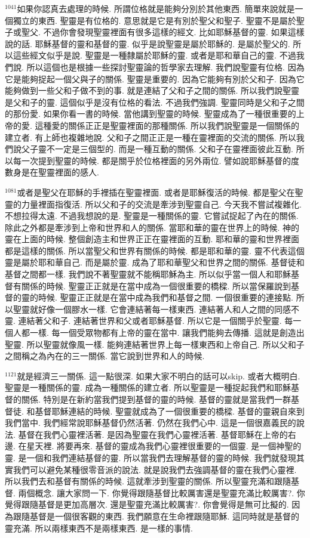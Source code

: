 \documentclass{book}
\begin{document}
$^{1041}$如果你認真去處理的時候.
所謂位格就是能夠分別於其他東西.
簡單來說就是一個獨立的東西.
聖靈是有位格的.
意思就是它是有別於聖父和聖子.
聖靈不是屬於聖子或聖父.
不過你會發現聖靈裡面有很多這樣的經文.
比如耶穌基督的靈.
如果這樣說的話.
耶穌基督的靈和基督的靈.
似乎是說聖靈是屬於耶穌的.
是屬於聖父的.
所以這些經文似乎是說.
聖靈是一種隸屬於耶穌的靈.
或者是耶和華自己的靈.
不過我們說.
所以這個也是根據一些探討聖靈論的哲學家去理解.
我們說聖靈有位格.
因為它是能夠捉起一個父與子的關係.
聖靈是重要的.
因為它能夠有別於父和子.
因為它能夠做到一些父和子做不到的事.
就是連結了父和子之間的關係.
所以我們說聖靈是父和子的靈.
這個似乎是沒有位格的看法.
不過我們強調.
聖靈同時是父和子之間的那份愛.
如果你看一書的時候.
當他講到聖靈的時候.
聖靈成為了一種很重要的上帝的愛.
這種愛的關係正正是聖靈裡面的那種關係.
所以我們說聖靈是一個關係的建立者.
有上師也複雜地說.
父和子之間正正是一種在靈裡面的交流的關係.
所以我們說父子靈不一定是三個型的.
而是一種互動的關係.
父和子在靈裡面彼此互動.
所以每一次提到聖靈的時候.
都是關乎於位格裡面的另外兩位.
譬如說耶穌基督的度數身是在聖靈裡面的感人.

$^{1081}$或者是聖父在耶穌的手裡插在聖靈裡面.
或者是耶穌復活的時候.
都是聖父在聖靈的力量裡面指復活.
所以父和子的交流是牽涉到聖靈自己.
今天我不嘗試複雜化.
不想拉得太遠.
不過我想說的是.
聖靈是一種關係的靈.
它嘗試捉起了內在的關係.
除此之外都是牽涉到上帝和世界和人的關係.
當耶和華的靈在世界上的時候.
神的靈在上面的時候.
整個創造主和世界正正在靈裡面的互動.
耶和華的靈和世界裡面都是這樣的關係.
所以當聖父和世界有關係的時候.
都是耶和華的靈.
靈不代表這個靈是屬於耶和華自己.
而是屬於靈.
成為了耶和華聖父和世界之間的關係.
基督徒和基督之間都一樣.
我們說不著聖靈就不能稱耶穌為主.
所以似乎當一個人和耶穌基督有關係的時候.
聖靈正正就是在當中成為一個很重要的橋樑.
所以當保羅說到基督的靈的時候.
聖靈正正就是在當中成為我們和基督之間.
一個很重要的連接點.
所以聖靈就好像一個膠水一樣.
它會連結著每一樣東西.
連結著人和人之間的同感不靈.
連結著父和子.
連結著世界和父或者耶穌基督.
所以它是一個關乎於聖靈.
每一個人都一樣.
每一個受眾物都有上帝的靈在當中.
讓我們能夠去傳播.
這就是創造出聖靈.
所以聖靈就像風一樣.
能夠連結著世界上每一樣東西和上帝自己.
所以父和子之間稱之為內在的三一關係.
當它說到世界和人的時候.

$^{1121}$就是經濟三一關係.
這一點很深.
如果大家不明白的話可以skip.
或者大概明白.
聖靈是一種關係的靈.
成為一種關係的建立者.
所以聖靈是一種捉起我們和耶穌基督的關係.
特別是在新約當我們提到基督的靈的時候.
基督的靈就是當我們一群基督徒.
和基督耶穌連結的時候.
聖靈就成為了一個很重要的橋樑.
基督的靈親自來到我們當中.
我們經常說耶穌基督仍然活著.
仍然在我們心中.
這是一個很嘉義民的說法.
基督在我們心靈裡活著.
是因為聖靈在我們心靈裡活著.
基督耶穌在上帝的右邊.
在星天裡.
將要再來.
基督的靈成為我們心靈裡很重要的一個靈.
是一個神聖的靈.
是一個和我們連結基督的靈.
所以當我們去理解基督的靈的時候.
我們就發現其實我們可以避免某種很零音派的說法.
就是說我們去強調基督的靈在我們心靈裡.
所以我們去和基督有關係的時候.
這就牽涉到聖靈的關係.
所以聖靈充滿和跟隨基督.
兩個概念.
讓大家問一下.
你覺得跟隨基督比較厲害還是聖靈充滿比較厲害?.
你覺得跟隨基督是更加高層次.
還是聖靈充滿比較厲害?.
你會覺得是無可比擬的.
因為跟隨基督是一個很客觀的東西.
我們願意在生命裡跟隨耶穌.
這同時就是基督的靈充滿.
所以兩樣東西不是兩樣東西.
是一樣的事情.
\end{document}
